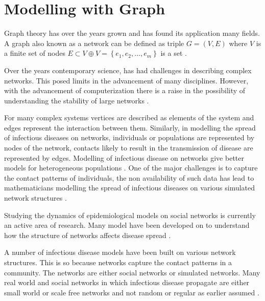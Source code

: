 \section{Modelling with Graph}
Graph theory has over the years grown and has found its application many fields. A graph also known as a network   can be  defined as triple $G = (V,E)$ where $V$ is a finite set of nodes $E \subset V \oplus V = \left\lbrace e_1,e_2,\dots ,e_m \right\rbrace$ is a set  \citep{estrada2012structure}. 

Over the years contemporary science, has had challenges in describing complex networks. This posed limits in the advancement of many disciplines. However, with the advancement  of computerization there is a raise in the possibility of understanding the stability of large networks \cite{barabasi1999emergence} .

For many complex systems vertices are described as elements of the system and edges represent the interaction between them. Similarly, in modelling the spread of  infectious diseases on networks, individuals or populations are represented by nodes of the network, contacts likely to result in the transmission of disease are represented by edges. Modelling of infectious disease on networks give better models for heterogeneous populations \citep{ming2016stochastic}. One of the major challenges is to capture the contact patterns of individuals, the non availability of such data has lead to mathematicians modelling the spread of infectious diseases on various simulated network structures \citep{pastor2001}.

Studying the dynamics of epidemiological models on social networks is currently an active area of research. Many model have been developed on to understand  how the structure of networks affects disease spread \citep{keeling2005networks}.

A number of infectious disease models have been built on various network structures. This is so because networks capture the contact patterns in a community. The networks are either social networks or simulated networks. Many real world and social networks in which infectious disease propagate are either small world or scale free networks and not random or regular as earlier assumed \cite{watts1998collective}.

